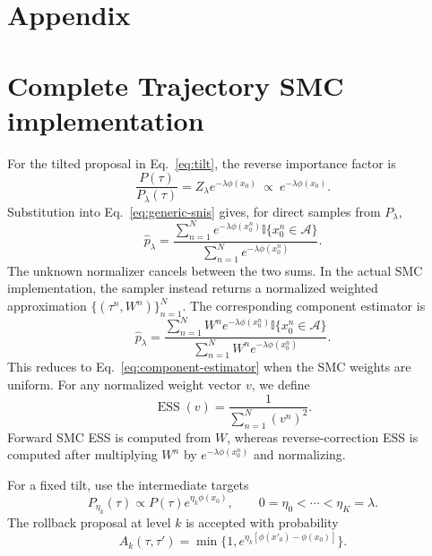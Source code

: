 \documentclass{article}
\newcommand{\ind}{\mathbb{I}}
\newcommand{\ESS}{\operatorname{ESS}}
\newcounter{algorithm}
\begin{document}



\appendix
\section*{Appendix}

\section{Complete Trajectory SMC implementation}
\label{app:complete-algorithm}

For the tilted proposal in Eq.~\eqref{eq:tilt}, the reverse importance factor
is
\begin{equation}
\frac{P(\tau)}{P_\lambda(\tau)}
=Z_\lambda e^{-\lambda\phi(x_0)}
\ \propto\ e^{-\lambda\phi(x_0)}.
\label{eq:reverse-factor}
\end{equation}
Substitution into Eq.~\eqref{eq:generic-snis} gives, for direct samples from
$P_\lambda$,
\begin{equation}
\widehat p_\lambda=
\frac{\sum_{n=1}^{N}e^{-\lambda\phi(x^n_0)}
\ind\{x^n_0\in\mathcal A\}}
{\sum_{n=1}^{N}e^{-\lambda\phi(x^n_0)}}.
\label{eq:component-estimator}
\end{equation}
The unknown normalizer cancels between the two sums. In the actual SMC
implementation, the sampler instead returns a normalized weighted
approximation $\{(\tau^n,W^n)\}_{n=1}^{N}$. The corresponding component
estimator is
\begin{equation}
\widehat p_\lambda=
\frac{\sum_{n=1}^{N}W^n e^{-\lambda\phi(x^n_0)}
\ind\{x^n_0\in\mathcal A\}}
{\sum_{n=1}^{N}W^n e^{-\lambda\phi(x^n_0)}}.
\label{eq:weighted-component-estimator}
\end{equation}
This reduces to Eq.~\eqref{eq:component-estimator} when the SMC weights are
uniform. For any normalized weight vector $v$, we define
\begin{equation}
\ESS(v)=\frac{1}{\sum_{n=1}^{N}(v^n)^2}.
\label{eq:ess-definition}
\end{equation}
Forward SMC ESS is computed from $W$, whereas reverse-correction ESS is
computed after multiplying $W^n$ by $e^{-\lambda\phi(x^n_0)}$ and normalizing.

For a fixed tilt, use the intermediate targets
\begin{equation}
P_{\eta_k}(\tau)\propto P(\tau)e^{\eta_k\phi(x_0)},
\qquad 0=\eta_0<\cdots<\eta_K=\lambda.
\label{eq:tempered-target}
\end{equation}
The rollback proposal at level $k$ is accepted with probability
\begin{equation}
A_k(\tau,\tau')
=\min\{1,e^{\eta_k[\phi(x'_0)-\phi(x_0)]}\}.
\label{eq:mh-acceptance}
\end{equation}
\end{document}
